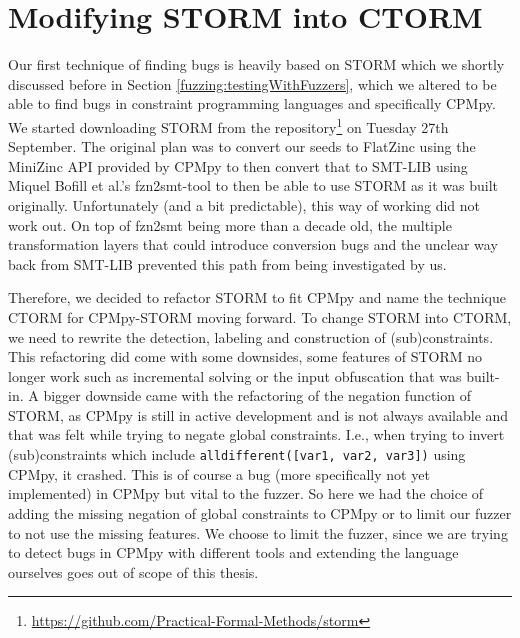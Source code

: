 \section{Modifying STORM into CTORM}
\label{impl:modifyingSTROM}
Our first technique of finding bugs is heavily based on STORM which we shortly discussed before in Section \ref{fuzzing:testingWithFuzzers}, which we altered to be able to find bugs in constraint programming languages and specifically CPMpy. We started downloading STORM from the repository\footnote{\url{https://github.com/Practical-Formal-Methods/storm}} on Tuesday 27th September.
The original plan was to convert our seeds to FlatZinc using the MiniZinc API provided by CPMpy to then convert that to SMT-LIB \cite{72bofill2010system} using Miquel Bofill et al.’s fzn2smt-tool to then be able to use STORM as it was built originally. Unfortunately (and a bit predictable), this way of working did not work out. On top of fzn2smt being more than a decade old, the multiple transformation layers that could introduce conversion bugs and the unclear way back from SMT-LIB prevented this path from being investigated by us.

Therefore, we decided to refactor STORM to fit CPMpy and name the technique CTORM for CPMpy-STORM moving forward. To change STORM into CTORM, we need to rewrite the detection, labeling and construction of (sub)constraints. This refactoring did come with some downsides, some features of STORM no longer work such as incremental solving or the input obfuscation that was built-in. A bigger downside came with the refactoring of the negation function of STORM, as CPMpy is still in active development and is not always available and that was felt while trying to negate global constraints. I.e., when trying to invert (sub)constraints which include \texttt{alldifferent([var1, var2, var3])} using CPMpy, it crashed. This is of course a bug (more specifically not yet implemented) in CPMpy but vital to the fuzzer. So here we had the choice of adding the missing negation of global constraints to CPMpy or to limit our fuzzer to not use the missing features. We choose to limit the fuzzer, since we are trying to detect bugs in CPMpy with different tools and extending the language ourselves goes out of scope of this thesis. 



